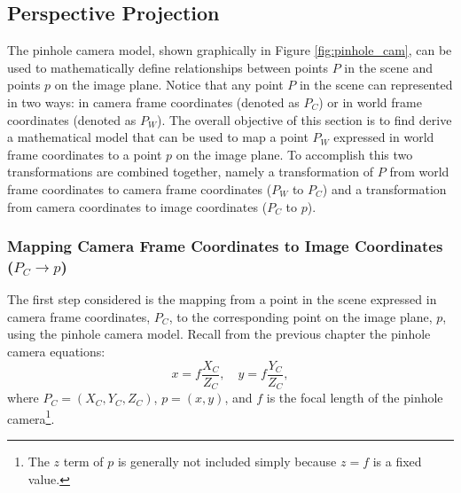 \subsection{Perspective Projection}
The pinhole camera model, shown graphically in Figure \ref{fig:pinhole_cam}, can be used to mathematically define relationships between points $P$ in the scene and points $p$ on the image plane. Notice that any point $P$ in the scene can represented in two ways: in camera frame coordinates (denoted as $P_C$) or in world frame coordinates (denoted as $P_W$). The overall objective of this section is to find derive a mathematical model that can be used to map a point $P_W$ expressed in world frame coordinates to a point $p$ on the image plane. To accomplish this two transformations are combined together, namely a transformation of $P$ from world frame coordinates to camera frame coordinates ($P_W$ to $P_C$) and a transformation from camera coordinates to image coordinates ($P_C$ to $p$).


\subsubsection{Mapping Camera Frame Coordinates to Image Coordinates ($P_C \xrightarrow{} p$)}
The first step considered is the mapping from a point in the scene expressed in camera frame coordinates, $P_C$, to the corresponding point on the image plane, $p$, using the pinhole camera model. Recall from the previous chapter the pinhole camera equations:
\begin{equation} \label{eq:PC2xy}
    x=f\frac{X_C}{Z_C}, \quad  y = f\frac{Y_C}{Z_C},
\end{equation}
where $P_C = (X_C, Y_C, Z_C)$, $p = (x, y)$, and $f$ is the focal length of the pinhole camera\footnote{The $z$ term of $p$ is generally not included simply because $z=f$ is a fixed value.}. 

